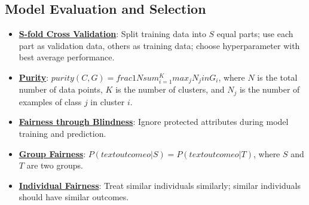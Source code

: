 \documentclass{article}%
\begin{document}
\subsection{Model Evaluation and Selection}%
\label{subsec:ModelEvaluationandSelection}%
\begin{itemize}[leftmargin=*]%
\item \href{https://purdue.brightspace.com/d2l/common/assets/pdfjs-d2l-dist/1.0.14-legacy/web/viewer.html?file=\%2Fcontent\%2Fenforced\%2F1095467-wl.202510.CS.24300.001\%2F10L1-CrossValidation.pdf\%3Fou\%3D1095467\&lang=en-us\&container=d2l-fileviewer-rendered-pdf\&fullscreen=d2l-fileviewer-rendered-pdf-dialog\&height=667#page=25}{\textbf{S-fold Cross Validation}}: Split training data into $S$ equal parts; use each part as validation data, others as training data; choose hyperparameter with best average performance.%
\item \href{https://purdue.brightspace.com/d2l/common/assets/pdfjs-d2l-dist/1.0.14-legacy/web/viewer.html?file=\%2Fcontent\%2Fenforced\%2F1095467-wl.202510.CS.24300.001\%2F12L2-distance-clusters.pdf\%3Fou\%3D1095467\&lang=en-us\&container=d2l-fileviewer-rendered-pdf\&fullscreen=d2l-fileviewer-rendered-pdf-dialog\&height=667#page=44}{\textbf{Purity}}: $purity(C, G) = frac{1}{N} sum_{i=1}^{K} max_{j} N_j in G_i$, where $N$ is the total number of data points, $K$ is the number of clusters, and $N_j$ is the number of examples of class $j$ in cluster $i$.%
\item \href{https://purdue.brightspace.com/d2l/common/assets/pdfjs-d2l-dist/1.0.14-legacy/web/viewer.html?file=\%2Fcontent\%2Fenforced\%2F1095467-wl.202510.CS.24300.001\%2F16L2-ethics.pdf\%3Fou\%3D1095467\&lang=en-us\&container=d2l-fileviewer-rendered-pdf\&fullscreen=d2l-fileviewer-rendered-pdf-dialog\&height=667#page=25}{\textbf{Fairness through Blindness}}: Ignore protected attributes during model training and prediction.%
\item \href{https://purdue.brightspace.com/d2l/common/assets/pdfjs-d2l-dist/1.0.14-legacy/web/viewer.html?file=\%2Fcontent\%2Fenforced\%2F1095467-wl.202510.CS.24300.001\%2F16L2-ethics.pdf\%3Fou\%3D1095467\&lang=en-us\&container=d2l-fileviewer-rendered-pdf\&fullscreen=d2l-fileviewer-rendered-pdf-dialog\&height=667#page=26}{\textbf{Group Fairness}}: $P(text{outcome } o | S) = P(text{outcome } o | T)$, where $S$ and $T$ are two groups.%
\item \href{https://purdue.brightspace.com/d2l/common/assets/pdfjs-d2l-dist/1.0.14-legacy/web/viewer.html?file=\%2Fcontent\%2Fenforced\%2F1095467-wl.202510.CS.24300.001\%2F16L2-ethics.pdf\%3Fou\%3D1095467\&lang=en-us\&container=d2l-fileviewer-rendered-pdf\&fullscreen=d2l-fileviewer-rendered-pdf-dialog\&height=667#page=27}{\textbf{Individual Fairness}}: Treat similar individuals similarly; similar individuals should have similar outcomes.%

\end{itemize}
\end{document}
